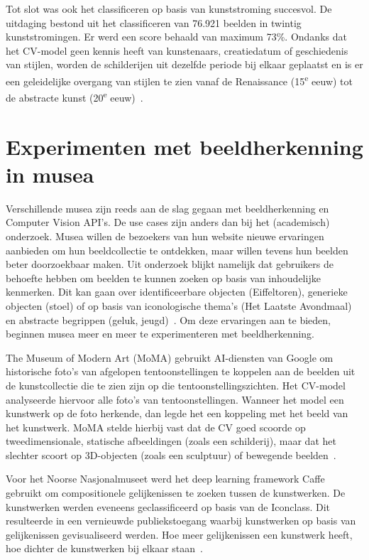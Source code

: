 Tot slot was ook het classificeren op basis van kunststroming succesvol. De uitdaging bestond uit het classificeren van 76.921 beelden in twintig kunststromingen. Er werd een score behaald van maximum 73\%. Ondanks dat het CV-model geen kennis heeft van kunstenaars, creatiedatum of geschiedenis van stijlen, worden de schilderijen uit dezelfde periode bij elkaar geplaatst en is er een geleidelijke overgang van stijlen te zien vanaf de Renaissance (15\textsuperscript{e} eeuw) tot de abstracte kunst (20\textsuperscript{e} eeuw)~\autocite{Elgammal2018}.

\section{Experimenten met beeldherkenning in musea}
\label{sec:beeldherkenning-musea}


Verschillende musea zijn reeds aan de slag gegaan met beeldherkenning en Computer Vision API’s. De use cases zijn anders dan bij het (academisch) onderzoek. Musea willen de bezoekers van hun website nieuwe ervaringen aanbieden om hun beeldcollectie te ontdekken, maar willen tevens hun beelden beter doorzoekbaar maken. Uit onderzoek blijkt namelijk dat gebruikers de behoefte hebben om beelden te kunnen zoeken op basis van inhoudelijke kenmerken. Dit kan gaan over identificeerbare objecten (Eiffeltoren), generieke objecten (stoel) of op basis van iconologische thema’s (Het Laatste Avondmaal) en abstracte begrippen (geluk, jeugd)~\autocite{Vanstappen2019}. Om deze ervaringen aan te bieden, beginnen musea meer en meer te experimenteren met beeldherkenning.

The Museum of Modern Art (MoMA) gebruikt AI-diensten van Google om historische foto’s van afgelopen tentoonstellingen te koppelen aan de beelden uit de kunstcollectie die te zien zijn op die tentoonstellingszichten. Het CV-model analyseerde hiervoor alle foto’s van tentoonstellingen. Wanneer het model een kunstwerk op de foto herkende, dan legde het een koppeling met het beeld van het kunstwerk. MoMA stelde hierbij vast dat de CV goed scoorde op tweedimensionale, statische afbeeldingen (zoals een schilderij), maar dat het slechter scoort op 3D-objecten (zoals een sculptuur) of bewegende beelden~\autocite{MOMA2018}.

Voor het Noorse Nasjonalmuseet werd het deep learning framework Caffe gebruikt om compositionele gelijkenissen te zoeken tussen de kunstwerken. De kunstwerken werden eveneens geclassificeerd op basis van de Iconclass. Dit resulteerde in een vernieuwde publiekstoegang waarbij kunstwerken op basis van gelijkenissen gevisualiseerd werden. Hoe meer gelijkenissen een kunstwerk heeft, hoe dichter de kunstwerken bij elkaar staan~\autocite{Nasjonalmuseet2017}.

